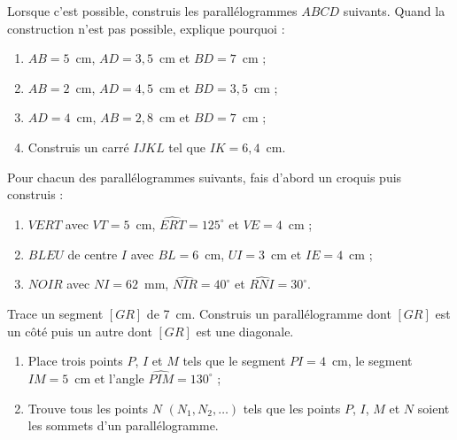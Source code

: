 \begin{exercice}
Lorsque c'est possible, construis les parallélogrammes $ABCD$ suivants. Quand la construction n'est pas possible, explique pourquoi :
\begin{enumerate}
 \item $AB = 5$ cm, $AD = 3,5$ cm et $BD = 7$ cm ;
 \item $AB = 2$ cm, $AD = 4,5$ cm et $BD= 3,5$ cm ;
 \item $AD = 4$ cm, $AB = 2,8$ cm et $BD = 7$ cm ;
 \item Construis un carré $IJKL$ tel que $IK = 6,4$ cm.
 \end{enumerate}
\end{exercice}


\begin{exercice}
Pour chacun des parallélogrammes suivants, fais d’abord un croquis puis construis :
\begin{enumerate}
 \item $VERT$ avec $VT = 5$ cm, $\widehat{ERT} = 125^\circ$ et $VE = 4$ cm ;
 \item $BLEU$ de centre $I$ avec $BL = 6$ cm, $UI = 3$ cm et $IE = 4$ cm ;
 \item $NOIR$ avec $NI = 62$ mm, $\widehat{NIR} = 40^\circ$ et $\widehat{RNI} = 30^\circ$.  
 \end{enumerate}
\end{exercice}

\begin{exercice}
Trace un segment $[GR]$ de 7 cm. Construis un parallélogramme dont $[GR]$ est un côté puis un autre dont $[GR]$ est une diagonale.
\end{exercice}


\begin{exercice}
\begin{enumerate}
 \item Place trois points $P$, $I$ et $M$ tels que le segment $PI = 4$ cm, le segment $IM = 5$ cm et l'angle $\widehat{PIM} = 130^\circ$ ;
 \item Trouve tous les points $N$ $(N_1, N_2, \ldots)$ tels que les points $P$, $I$, $M$ et $N$ soient les sommets d'un parallélogramme.
 \end{enumerate}
\end{exercice}







